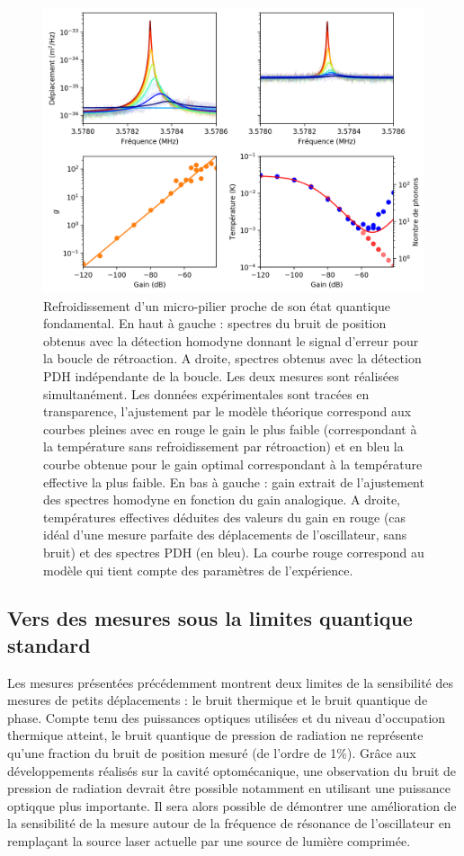 \documentclass[12pt,a4paper]{article}
\begin{document}
\begin{figure}
\center
\includegraphics[scale=0.75]{figures/feedback_cooling_6phonons_defense_with_gain_all.png}
\caption{Refroidissement d'un micro-pilier proche de son état quantique fondamental.
En haut à gauche : spectres du bruit de position obtenus avec la détection homodyne donnant le signal d'erreur pour la boucle de rétroaction.
A droite, spectres obtenus avec la détection PDH indépendante de la boucle.
Les deux mesures sont réalisées simultanément.
Les données expérimentales sont tracées en transparence, l'ajustement par le modèle théorique correspond aux courbes pleines avec en rouge le gain le plus faible (correspondant à la température sans refroidissement par rétroaction) et en bleu la courbe obtenue pour le gain optimal correspondant à la température effective la plus faible.
En bas à gauche : gain extrait de l'ajustement des spectres homodyne en fonction du gain analogique.
A droite, températures effectives déduites des valeurs du gain en rouge (cas idéal d'une mesure parfaite des déplacements de l'oscillateur, sans bruit) et des spectres PDH (en bleu).
La courbe rouge correspond au modèle qui tient compte des paramètres de l'expérience.}
\label{fig:feedback_cooling_pillar}
\end{figure}

\subsection{Vers des mesures sous la limites quantique standard}

Les mesures présentées précédemment montrent deux limites de la sensibilité des mesures de petits déplacements : le bruit thermique et le bruit quantique de phase.
Compte tenu des puissances optiques utilisées et du niveau d'occupation thermique atteint, le bruit quantique de pression de radiation ne représente qu'une fraction du bruit de position mesuré (de l'ordre de \unit{1}{\%}).
Grâce aux développements réalisés sur la cavité optomécanique, une observation du bruit de pression de radiation devrait être possible notamment en utilisant une puissance optiqque plus importante.
Il sera alors possible de démontrer une amélioration de la sensibilité de la mesure autour de la fréquence de résonance de l'oscillateur en remplaçant la source laser actuelle par une source de lumière comprimée.
\end{document}
